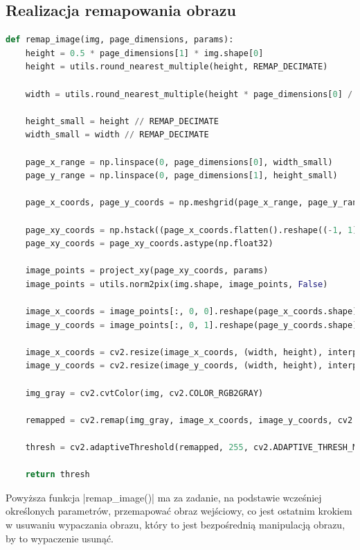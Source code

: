 \subsection{Realizacja remapowania obrazu}

\begin{lstlisting}[caption={\pyth|remap_image()| - funkcja remapowania wypaczonego obrazu.}, label={remap-image}, language=Python]
def remap_image(img, page_dimensions, params):
	height = 0.5 * page_dimensions[1] * img.shape[0]
	height = utils.round_nearest_multiple(height, REMAP_DECIMATE)
	
	width = utils.round_nearest_multiple(height * page_dimensions[0] / page_dimensions[1], REMAP_DECIMATE)
	
	height_small = height // REMAP_DECIMATE
	width_small = width // REMAP_DECIMATE
	
	page_x_range = np.linspace(0, page_dimensions[0], width_small)
	page_y_range = np.linspace(0, page_dimensions[1], height_small)
	
	page_x_coords, page_y_coords = np.meshgrid(page_x_range, page_y_range)
	
	page_xy_coords = np.hstack((page_x_coords.flatten().reshape((-1, 1)), page_y_coords.flatten().reshape((-1, 1))))
	page_xy_coords = page_xy_coords.astype(np.float32)
	
	image_points = project_xy(page_xy_coords, params)
	image_points = utils.norm2pix(img.shape, image_points, False)
	
	image_x_coords = image_points[:, 0, 0].reshape(page_x_coords.shape)
	image_y_coords = image_points[:, 0, 1].reshape(page_y_coords.shape)
	
	image_x_coords = cv2.resize(image_x_coords, (width, height), interpolation=cv2.INTER_CUBIC)
	image_y_coords = cv2.resize(image_y_coords, (width, height), interpolation=cv2.INTER_CUBIC)
	
	img_gray = cv2.cvtColor(img, cv2.COLOR_RGB2GRAY)
	
	remapped = cv2.remap(img_gray, image_x_coords, image_y_coords, cv2.INTER_CUBIC, None, cv2.BORDER_REPLICATE)
	
	thresh = cv2.adaptiveThreshold(remapped, 255, cv2.ADAPTIVE_THRESH_MEAN_C, cv2.THRESH_BINARY, ADA_THRESH_WIN_SZ, 25)
	
	return thresh
\end{lstlisting}

Powyższa funkcja \pyth|remap_image()| ma za zadanie, na podstawie wcześniej określonych parametrów, przemapować obraz wejściowy, co jest ostatnim krokiem w usuwaniu wypaczania obrazu, który to jest bezpośrednią manipulacją obrazu, by to wypaczenie usunąć.

